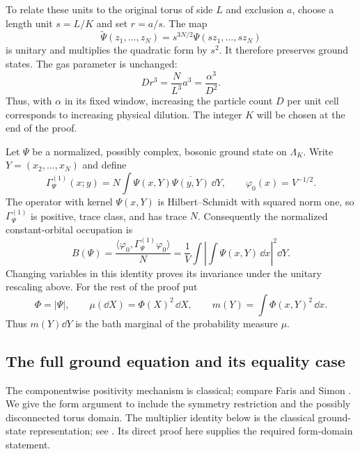 To relate these units to the original torus of side $L$ and exclusion
$a$, choose a length unit $s=L/K$ and set $r=a/s$. The map
\[
 \widetilde\Psi(z_1,\ldots,z_N)
       =s^{3N/2}\Psi(sz_1,\ldots,sz_N)
\]
is unitary and multiplies the quadratic form by $s^2$. It therefore
preserves ground states. The gas parameter is unchanged:
\begin{equation}\label{setup:gas-parameter}
 Dr^3=\frac{N}{L^3}a^3=\frac{\alpha^3}{D^2}.
\end{equation}
Thus, with $\alpha$ in its fixed window, increasing the particle count
$D$ per unit cell corresponds to increasing physical dilution. The integer
$K$ will be chosen at the end of the proof.

Let $\Psi$ be a normalized, possibly complex, bosonic ground state on
$\Lambda_K$. Write $Y=(x_2,\ldots,x_N)$ and define
\[
 \Gamma^{(1)}_\Psi(x;y)
   =N\int\Psi(x,Y)\overline{\Psi(y,Y)}\,\dd Y,
 \qquad \varphi_0(x)=V^{-1/2}.
\]
The operator with kernel $\Psi(x,Y)$ is Hilbert--Schmidt with squared
norm one, so $\Gamma^{(1)}_\Psi$ is positive, trace class, and has trace
$N$. Consequently the normalized constant-orbital occupation is
\begin{equation}\label{setup:occupation}
 B(\Psi)=\frac{\langle\varphi_0,
                       \Gamma^{(1)}_\Psi\varphi_0\rangle}{N}
       =\frac1V\int\left|\int\Psi(x,Y)\,\dd x\right|^2\dd Y.
\end{equation}
Changing variables in this identity proves its invariance under the
unitary rescaling above. For the rest of the proof put
\begin{equation}\label{setup:position-law}
 \Phi=|\Psi|,\qquad \mu(\dd X)=\Phi(X)^2\,\dd X,
 \qquad m(Y)=\int\Phi(x,Y)^2\,\dd x.
\end{equation}
Thus $m(Y)\dd Y$ is the bath marginal of the probability measure $\mu$.

\subsection{The full ground equation and its equality case}

The componentwise positivity mechanism is classical; compare
Faris and Simon \cite[Lemmas~1 and~3]{FarisSimon1975GroundStates}.
We give the form argument to include the symmetry restriction and the
possibly disconnected torus domain. The multiplier identity below is the
classical ground-state representation; see
\cite[Section~2.3]{FrankSeiringer2008}. Its direct proof here supplies the
required form-domain statement.

